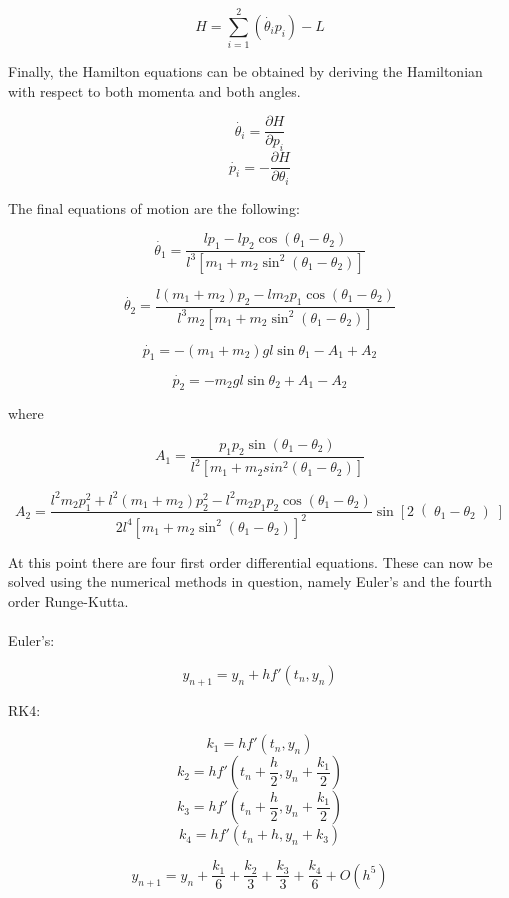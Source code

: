 \documentclass[a4paper,12pt]{article}
\begin{document}
\[H = \sum_{i=1}^{2} \left( \dot{\theta_i} p_i \right) - L \]

Finally, the Hamilton equations can be obtained by deriving the Hamiltonian
with respect to both momenta and both angles.

\[ \dot{\theta_i} = \frac{\partial H}{\partial p_i} \]
\[ \dot{p_i} = - \frac{\partial H}{\partial \theta_i} \]

The final equations of motion are the following:

\[ \dot{\theta_1} = \frac{l p_1 - l p_2 \cos \left(\theta_1 - \theta_2 \right)}
						 {l^3 \left[ m_1 + m_2 \sin^2 \left( \theta_1 - 
							\theta_2 \right) \right]} \]

\[ \dot{\theta_2} = \frac{l \left(m_1 + m_2\right) p_2 - l m_2 p_1 \cos 
									\left(\theta_1 - \theta_2 \right)}
						 {l^3 m_2 \left[ m_1 + m_2 \sin^2 \left( \theta_1 - 
							\theta_2 \right) \right]} \]

\[ \dot{p_1} = - \left(m_1 + m_2\right) g l \sin \theta_1 - A_1 + A_2\]

\[ \dot{p_2} = - m_2 g l \sin \theta_2 + A_1 - A_2\]

where

\[ A_1 = \frac{p_1 p_2 \sin \left( \theta_1 - \theta_2 \right)}
			  {l^2 \left[m_1 + m_2 sin^2 \left( \theta_1 - \theta_2 \right)\right]} \]
			  
\[ A_2 = \frac{l^2 m_2 p_1^2 + l^2 \left( m_1 + m_2 \right) p_2^2 - l^2 m_2 p_1 p_2 
					\cos \left( \theta_1 - \theta_2 \right)}
			  {2 l^4 \left[ m_1 + m_2 \sin^2 \left( \theta_1 - 
					\theta_2 \right)\right]^2}
		 \sin \left[ 2 \right( \theta_1 - \theta_2 \left) \right] \]

At this point there are four first order differential equations. These can
now be solved using the numerical methods in question, namely Euler's and
the fourth order Runge-Kutta. \\ \\
\indent Euler's:

\[ y_{n+1} = y_n + h f' \left( t_n, y_n \right)\]

RK4:

\[ k_1 = h f' \left(t_n, y_n \right) \]
\[ k_2 = h f' \left(t_n + \frac{h}{2}, y_n + \frac{k_1}{2} \right) \]
\[ k_3 = h f' \left(t_n + \frac{h}{2}, y_n + \frac{k_1}{2} \right) \]
\[ k_4 = h f' \left(t_n + h, y_n + k_3 \right) \]

\[ y_{n+1} = y_n + \frac{k_1}{6} + \frac{k_2}{3} + \frac{k_3}{3} + 
					\frac{k_4}{6} + O \left( h^5 \right)\]
\end{document}
